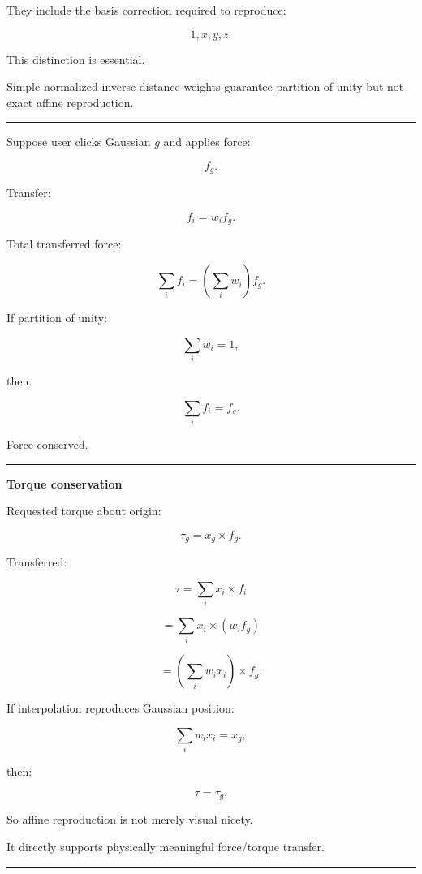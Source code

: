 They include the basis correction required to reproduce:

\[
1,x,y,z.
\]

This distinction is essential.

Simple normalized inverse-distance weights guarantee partition of unity but not exact affine reproduction.

\begin{center}\rule{0.5\linewidth}{0.5pt}\end{center}

Suppose user clicks Gaussian \(g\) and applies force:

\[
f_g.
\]

Transfer:

\[
\boxed{
f_i
=
w_i f_g.
}
\]

Total transferred force:

\[
\sum_i f_i
=
\left(
\sum_iw_i
\right)f_g.
\]

If partition of unity:

\[
\sum_iw_i=1,
\]

then:

\[
\boxed{
\sum_i f_i=f_g.
}
\]

Force conserved.

\begin{center}\rule{0.5\linewidth}{0.5pt}\end{center}

\textbf{Torque conservation}

Requested torque about origin:

\[
\tau_g=
x_g\times f_g.
\]

Transferred:

\[
\tau=
\sum_i
x_i\times f_i
\]

\[
=
\sum_i
x_i\times
(w_i f_g)
\]

\[
=
\left(
\sum_iw_ix_i
\right)
\times f_g.
\]

If interpolation reproduces Gaussian position:

\[
\sum_iw_ix_i=x_g,
\]

then:

\[
\boxed{
\tau=\tau_g.
}
\]

So affine reproduction is not merely visual nicety.

It directly supports physically meaningful force/torque transfer.

\begin{center}\rule{0.5\linewidth}{0.5pt}\end{center}

